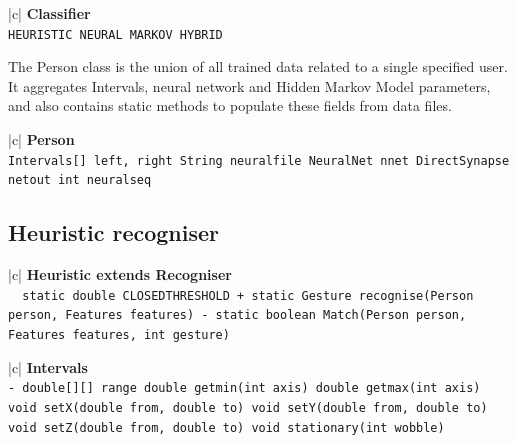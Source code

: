 \documentclass[12pt,a4,notitlepage]{report}
\renewcommand{\_}{\texttt{\symbol{95}}}
\newcommand{\<}{\texttt{\symbol{60}}}
\renewcommand{\>}{\texttt{\symbol{62}}}
\newcommand{\class}[1]{\textbf{#1}}
\newcommand{\variable}[1]{\texttt{#1}}
\begin{document}
{\begin{minipage}[t]{4cm}
\begin{tabular}{|c|} \hline 
\class{Classifier} \\ \hline
{}
{\variable{HEURISTIC \newline NEURAL \newline MARKOV \newline HYBRID
} } \\ \hline
\end{tabular}
\end{minipage} \hfill

The Person class is the union of all trained data related to a single specified user. It aggregates Intervals, neural network and Hidden Markov Model parameters, and also contains static methods to populate these fields from data files.

\begin{tabular}{|c|} \hline 
\class{Person} \\ \hline
{}
{\variable{Intervals[] left, right \newline String neural\_file \newline NeuralNet nnet \newline DirectSynapse netout \newline int neural\_seq 
} } \\ \hline
\end{tabular}

\newpage

\subsection{Heuristic recogniser}

\begin{tabular}{|c|} \hline 
\class{Heuristic extends Recogniser} \\ \hline
{}
{\variable{\ \ static double CLOSED\_THRESHOLD \newline
 + static Gesture recognise(Person person, Features features) \newline
 - static boolean Match(Person person, Features features, int gesture)
} } \\ \hline
\end{tabular}

\begin{tabular}{|c|} \hline 
\class{Intervals} \\ \hline
{}
{\variable{- double[][] range \newline
  double get\_min(int axis) \newline
  double get\_max(int axis) \newline
  void setX(double from, double to) \newline
  void setY(double from, double to) \newline
  void setZ(double from, double to) \newline
  void stationary(int wobble)
} } \\ \hline
\end{tabular}

}
\end{document}
